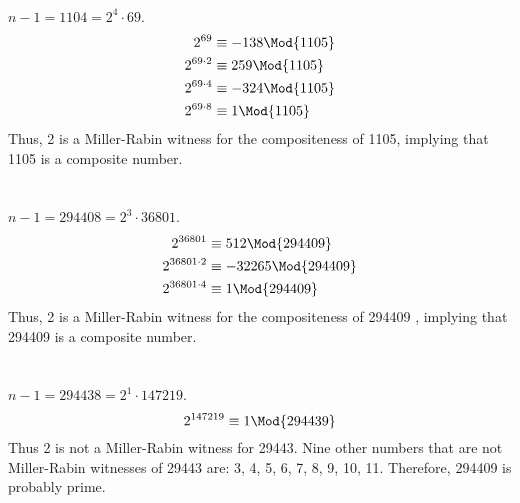 \documentclass[
  coursecode={MTHE 418},
  assignmentname={Homework \homeworknumber},
  studentnumber=20053722,
  name={Bryan Hoang},
  draft,
]{
  ltxanswer%
}
\date{2022-02-28}
\begin{document}
  \begin{questions}
    \setcounter{question}{\questionnumber}
    \addtocounter{question}{-1}
    \question[10]\
    \begin{parts}
      \part{}
      \begin{solution}
        \(n - 1 = 1104 = 2^{4} \cdot 69\).
        \begin{align*}
          2^{69}         &\equiv -138 \Mod{1105} \\
          2^{69 \cdot 2} &\equiv 259 \Mod{1105}  \\
          2^{69 \cdot 4} &\equiv -324 \Mod{1105} \\
          2^{69 \cdot 8} &\equiv 1 \Mod{1105}    \\
        \end{align*}
        Thus, 2 is a Miller-Rabin witness for the compositeness of 1105, implying that 1105 is a composite number.
      \end{solution}

      \part{}
      \begin{solution}
        \(n - 1 = 294408 = 2^{3} \cdot 36801\).
        \begin{align*}
          2^{36801}         &\equiv 512 \Mod{294409}    \\
          2^{36801 \cdot 2} &\equiv -32265 \Mod{294409} \\
          2^{36801 \cdot 4} &\equiv 1 \Mod{294409}      \\
        \end{align*}
        Thus, 2 is a Miller-Rabin witness for the compositeness of 294409 , implying that 294409 is a composite number.
      \end{solution}

      \part{}
      \begin{solution}
        \(n - 1 = 294438 = 2^{1} \cdot 147219\).
        \begin{equation*}
          2^{147219} \equiv 1 \Mod{294439}
        \end{equation*}
        Thus 2 is not a Miller-Rabin witness for 29443. Nine other numbers that are not Miller-Rabin witnesses of 29443 are: 3, 4, 5, 6, 7, 8, 9, 10, 11. Therefore, 294409 is probably prime.
      \end{solution}


\end{parts}
\end{questions}
\end{document}
